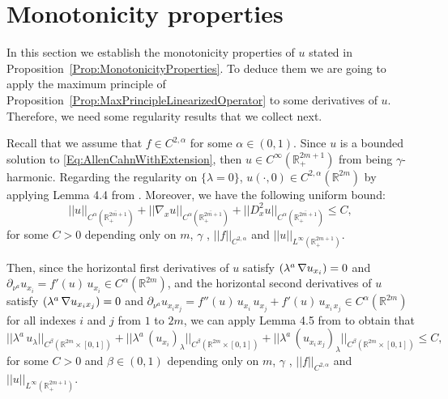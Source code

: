 \documentclass[12pt,reqno]{amsart}
\theoremstyle{definition}
\theoremstyle{remark}
\newcommand{\con}[1]{\mathbb{#1}}
\newcommand{\R}{\con{R}} %
\newcommand{\s}{\gamma}
\let\div\relax
\DeclareMathOperator{\div}{div}
\numberwithin{equation}{section}
\begin{document}
\section{Monotonicity properties}
\label{Sec:Monotonicity}

In this section we establish the monotonicity properties of $u$ stated in Proposition~\ref{Prop:MonotonicityProperties}. To deduce them we are going to apply the maximum principle of Proposition~\ref{Prop:MaxPrincipleLinearizedOperator} to some derivatives of $u$. Therefore, we need some regularity results that we collect next. 

Recall that we assume that $f\in C^{2,\alpha}$ for some $\alpha\in(0,1)$. Since $u$ is a bounded solution to \eqref{Eq:AllenCahnWithExtension}, then $u\in C^\infty(\R^{2m+1}_+)$ from being $\s$-harmonic. Regarding the regularity on $\{\lambda = 0\}$, $u(\cdot,0)\in C^{2,\alpha}(\R^{2m})$ by applying Lemma 4.4 from \cite{CabreSireI}. Moreover, we have the following uniform bound:
$$ ||u||_{C^\alpha\left(\overline{\R^{2m+1}_+}\right)} + ||\nabla_x u||_{C^\alpha\left(\overline{\R^{2m+1}_+}\right)} + ||D^2_x u||_{C^\alpha\left(\overline{\R^{2m+1}_+}\right)} \leq C, $$
for some $C>0$ depending only on $m$, $\s$ , $||f||_{C^{2,\alpha}}$ and $||u||_{L^\infty(\R^{2m+1}_+)}$.

Then, since the horizontal first derivatives of $u$ satisfy $\div(\lambda^a \, \nabla u_{x_i}) = 0$ and $\partial_{\nu^a}  u_{x_i} = f'(u) \,u_{x_i} \in C^\alpha(\R^{2m})$, and the  horizontal second derivatives of $u$ satisfy $\div(\lambda^a \, \nabla u_{x_i x_j}) = 0$ and $\partial_{\nu^a} u_{x_i x_j} = f''(u) \,u_{x_i}\,u_{x_j} + f'(u) \, u_{x_i\,x_j}\in C^\alpha(\R^{2m})$ for all indexes $i$ and $j$ from $1$ to $2m$, we can apply Lemma 4.5 from \cite{CabreSireI} to obtain that
$$
||\lambda^a \, u_\lambda||_{C^\beta\left(\R^{2m}\times [0,1]\right)} + ||\lambda^a \, (u_{x_i})_\lambda||_{C^\beta\left(\R^{2m}\times [0,1]\right)}  + ||\lambda^a \, (u_{x_i\,x_j})_\lambda||_{C^\beta\left(\R^{2m}\times [0,1]\right)} \leq C,
$$
for some $C>0$ and $\beta\in(0,1)$ depending only on $m$, $\s$ , $||f||_{C^{2,\alpha}}$ and $||u||_{L^\infty(\R^{2m+1}_+)}$.
\end{document}
